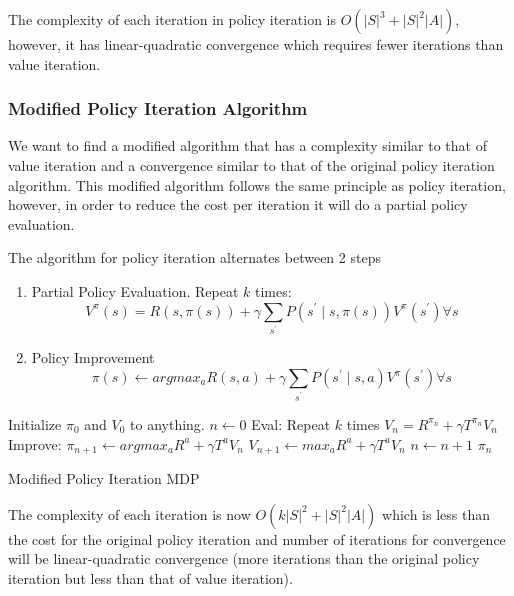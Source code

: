 \documentclass[12pt]{article}
\begin{document}
            The complexity of each iteration in policy iteration is $O(|S|^3 + |S|^2|A|)$, however, it has
            linear-quadratic convergence which requires fewer iterations than value iteration.

        \subsubsection{Modified Policy Iteration Algorithm}
            We want to find a modified algorithm that has a complexity similar to that of value iteration and a
            convergence similar to that of the original policy iteration algorithm. This modified algorithm follows the
            same principle as policy iteration, however, in order to reduce the cost per iteration it will do a partial
            policy evaluation. 

            The algorithm for policy iteration alternates between 2 steps
            \begin{enumerate}
                \item Partial Policy Evaluation. Repeat $k$ times:
                $$ V^{\pi}(s) = R(s, \pi(s)) + \gamma \sum_{s^{\prime}} P(s^{\prime} \mid s, \pi(s)) V^{\pi}(s^{\prime})
                \forall s $$
                \item Policy Improvement
                $$ \pi(s) \gets argmax_a R(s,a) + \gamma \sum_{s^{\prime}} P(s^{\prime} \mid s,a) V^{\pi}(s^{\prime})
                \forall s $$
            \end{enumerate}
            
            \begin{algorithm}[H] \label{ModifiedPolicyIterationAlgo}
                \SetAlgoLined
                Initialize $\pi_0$ and $V_0$ to anything. \;
                $n \gets 0$ \;
                 {
                    Eval: Repeat $k$ times \;
                    \Indp $V_n = R^{\pi_n} + \gamma T^{\pi_n} V_n$ \;
                    \Indm Improve: $\pi_{n+1} \gets argmax_a R^a + \gamma T^a V_n$ \;
                    \Indp $V_{n+1} \gets max_a R^a + \gamma T^a V_n$ \;
                    \Indm $n \gets n + 1$ \;
                }
                \Return $\pi_n$
                \caption{Modified Policy Iteration MDP}
            \end{algorithm}

            The complexity of each iteration is now $O(k|S|^2 + |S|^2|A|)$ which is less than the cost for the original
            policy iteration and number of iterations for convergence will be linear-quadratic convergence (more
            iterations than the original policy iteration but less than that of value iteration).
\end{document}
